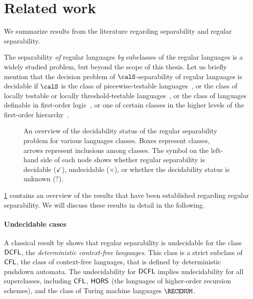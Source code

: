 \documentclass[../../diss.tex]{subfiles}
\begin{document}
\section{Related work}%
\label{Sectiopn:SeparabilityRelatedWork}%

We summarize results from the literature regarding separability and regular separability.

The separability \emph{of} regular languages \emph{by} subclasses of the regular languages is a widely studied problem, but beyond the scope of this thesis.
Let us briefly mention that the decision problem of $\calS$-separability of regular languages is decidable if $\calS$ is the class of piecewise-testable languages~\cite{CzerwinskiMM13,PlaceVZ13}, or the class of locally testable or locally threshold-testable languages~\cite{PlaceVZ13b}, or the class of  languages definable in first-order logic~\cite{PlaceZ14}, or one of certain classes in the higher levels of the first-order hierarchy~\cite{PlaceZ14b}.

\begin{figure}
    \centering%
    \caption{An overview of the decidability status of the regular separability problem for various languages classes. Boxes represent classes, arrows represent inclusions among classes. The symbol on the left-hand side of each node shows whether regular separability is decidable ($\checkmark$), undecidable ($\bm\times$), or whether the decidability status is unknown ($\bm?$).}%
    \label{Figure:RegularSeparabilityRelatedWork}%
\end{figure}

\cref{Figure:RegularSeparabilityRelatedWork} contains an overview of the results that have been established regarding regular separability.
We will discuss these results in detail in the following.

\paragraph{Undecidable cases}

A classical result by  shows that regular separability is undecidable for the class ${\mathsf{DCFL}}$, the \emph{deterministic context-free languages}.
This class is a strict subclass of ${\mathsf{CFL}}$, the class of context-free languages, that is defined by deterministic pushdown automata.
The undecidability for ${\mathsf{DCFL}}$ implies undecidability for all superclasses, including ${\mathsf{CFL}}$, ${\mathsf{HORS}}$ (the languages of higher-order recursion schemes), and the class of Turing machine languages $\RECENUM$.
\end{document}
